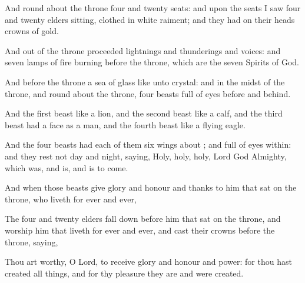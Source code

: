{And round
about the
throne
{}
four
and
twenty
seats:
and
upon the
seats I
saw
four
and
twenty
elders
sitting,
clothed
in
white
raiment;
and they
had
on
their
heads
crowns of
gold.

And out
of the
throne
proceeded
lightnings
and
thunderings
and
voices:
and
{}
seven
lamps of
fire
burning
before the
throne,
which
are the
seven
Spirits of
God.

And
before the
throne
{} a
sea of
glass like
unto
crystal:
and
in the
midst of the
throne,
and round
about the
throne,
{}
four
beasts full
of
eyes
before
and
behind.

And the
first
beast
{}
like a
lion,
and the
second
beast
like a
calf,
and the
third
beast
had a
face
as a
man,
and the
fourth
beast
{}
like a
flying
eagle.

And the
four
beasts
had
each of
them
six
wings
about
{};
and
{}
full of
eyes
within:
and they
rest
not
day
and
night,
saying,
Holy,
holy,
holy,
Lord
God
Almighty,
which
was,
and
is,
and is to
come.

And
when
those
beasts
give
glory
and
honour
and
thanks to
him that
sat
on the
throne,
who
liveth
for
ever and
ever,

The
four
and
twenty
elders fall
down
before
him that
sat
on the
throne,
and
worship
him that
liveth
for
ever and
ever,
and
cast
their
crowns
before the
throne,
saying,

Thou
art
worthy, O
Lord, to
receive
glory
and
honour
and
power:
for
thou hast
created all
things,
and
for
thy
pleasure they
are
and were
created.




\par }
